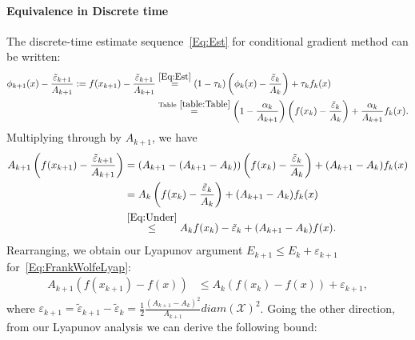 \documentclass[11pt]{article}
\theoremstyle{plain}
\newcommand{\X}{{\mathcal X}}
\begin{document}
\paragraph{Equivalence in Discrete time}
The discrete-time estimate sequence~\eqref{Eq:Est} for conditional gradient method can be written:
\begin{align*}
\phi_{k+1}(x) - \frac{\tilde \varepsilon_{k+1}}{A_{k+1}} := f(x_{k+1})  - \frac{\tilde \varepsilon_{k+1}}{A_{k+1}}&\overset{\eqref{Eq:Est}}{=} (1 - \tau_k) \left(\phi_k(x) - \frac{\tilde \varepsilon_k}{A_k}\right) + \tau_k f_k(x) \\
&\overset{\text{Table}~\ref{table:Table}}{=} \left(1 - \frac{\alpha_k}{A_{k+1}} \right)\left(f(x_k) -\frac{\tilde \varepsilon_k}{A_k}\right) + \frac{\alpha_k}{A_{k+1}} f_k(x).
\end{align*}
Multiplying through by $A_{k+1}$, we have
\begin{align*}
A_{k+1} \left(f(x_{k+1}) - \frac{\tilde \varepsilon_{k+1}}{A_{k+1}}\right) &= (A_{k+1} - (A_{k+1} - A_k)) \left(f(x_k) - \frac{\tilde \varepsilon_k}{A_k}\right) + (A_{k+1} - A_k) f_k(x)\\
&=  A_k \left(f(x_k) - \frac{\tilde \varepsilon_k}{A_k}\right) + (A_{k+1} - A_k) f_k(x)\\
& \overset{\eqref{Eq:Under}}{\leq}  A_k f(x_k)  - \tilde \varepsilon_k + (A_{k+1} - A_k) f(x).\
\end{align*}
Rearranging, we obtain our Lyapunov argument $E_{k+1} \leq E_k + \varepsilon_{k+1}$ for~\eqref{Eq:FrankWolfeLyap}:
\begin{align*}
A_{k+1}(f(x_{k+1}) - f(x))  &\leq A_k (f(x_k) - f(x)) + \varepsilon_{k+1},
\end{align*}
where $\varepsilon_{k+1} = \tilde \varepsilon_{k+1} - \tilde \varepsilon_k = \frac{1}{2}\frac {(A_{k+1} - A_k)^2}{A_{k+1}} diam(\X)^2$.
Going the other direction, from our Lyapunov analysis we can derive the following bound:
\end{document}
